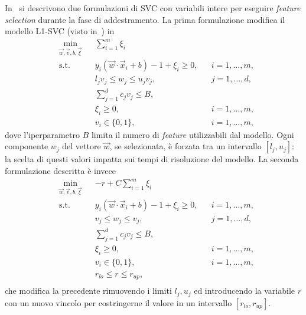 In~\cite{2014_MIP_feature_selection} si descrivono due formulazioni di SVC  con variabili intere per eseguire \emph{feature selection} durante la fase di addestramento.
La prima formulazione modifica il modello L1-SVC (visto in~) in 
\begin{equation*}
\begin{aligned}
& \min_{\Vec{w}, \Vec{v}, b, \Vec{\xi}}    && \sum_{i=1}^{m} \xi_i \\
& \textrm{s.t.} && y_i(\Vec{w}\cdot \Vec{x}_i + b) - 1 + \xi_i \geq 0,   && i=1,\dots,m, \\
&               && l_jv_j \leq w_j \leq u_jv_j,                          && j=1,\dots,d, \\
&               && \sum_{j=1}^{d} c_jv_j \leq B,                                        \\
&               && \xi_i \geq 0,                                         && i=1,\dots,m, \\
&               && v_i \in \{0,1\},                                      && i=1,\dots,m, 
\end{aligned}
\end{equation*}
dove l'iperparametro $B$ limita il numero di \emph{feature} utilizzabili dal modello.
Ogni componente $w_j$ del vettore $\Vec{w}$, se selezionata, è forzata tra un intervallo $[l_j,u_j]$: la scelta di questi valori impatta sui tempi di risoluzione del modello.
La seconda formulazione descritta è invece
\begin{equation*}
\begin{aligned}
& \min_{\Vec{w}, \Vec{v}, b, \Vec{\xi}}    && -r + C\sum_{i=1}^{m} \xi_i \\
& \textrm{s.t.} && y_i(\Vec{w}\cdot \Vec{x}_i + b) - 1 + \xi_i \geq 0,   && i=1,\dots,m, \\
&               && v_j \leq w_j \leq v_j,                                && j=1,\dots,d, \\
&               && \sum_{j=1}^{d} c_jv_j \leq B,                                        \\
&               && \xi_i \geq 0,                                         && i=1,\dots,m, \\
&               && v_i \in \{0,1\},                                      && i=1,\dots,m, \\
&               && r_{lo} \leq r \leq r_{up}, \\
\end{aligned}
\end{equation*}
che modifica la precedente rimuovendo i limiti $l_j,u_j$ ed introducendo la variabile $r$ con un nuovo vincolo per costringerne il valore in un intervallo $[r_{lo}, r_{up}]$.

